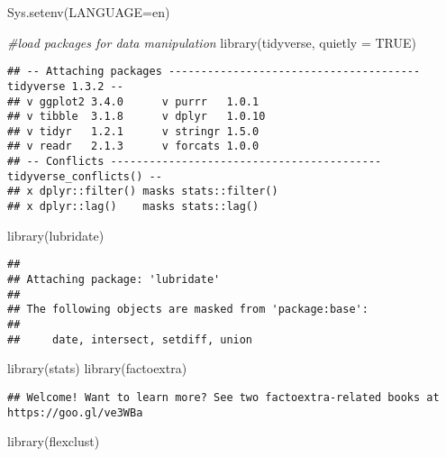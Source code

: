 \documentclass[
]{article}
\newenvironment{Shaded}{\begin{snugshade}}{\end{snugshade}}
\newcommand{\AttributeTok}[1]{\textcolor[rgb]{0.77,0.63,0.00}{#1}}
\newcommand{\CommentTok}[1]{\textcolor[rgb]{0.56,0.35,0.01}{\textit{#1}}}
\newcommand{\ConstantTok}[1]{\textcolor[rgb]{0.00,0.00,0.00}{#1}}
\newcommand{\FunctionTok}[1]{\textcolor[rgb]{0.00,0.00,0.00}{#1}}
\newcommand{\NormalTok}[1]{#1}
\newcommand{\StringTok}[1]{\textcolor[rgb]{0.31,0.60,0.02}{#1}}
\begin{document}
\begin{Shaded}
\begin{Highlighting}[]
\FunctionTok{Sys.setenv}\NormalTok{(}\AttributeTok{LANGUAGE=}\StringTok{\textquotesingle{}en\textquotesingle{}}\NormalTok{)}

\CommentTok{\#load packages for data manipulation}
\FunctionTok{library}\NormalTok{(tidyverse, }\AttributeTok{quietly =} \ConstantTok{TRUE}\NormalTok{)}
\end{Highlighting}
\end{Shaded}

\begin{verbatim}
## -- Attaching packages --------------------------------------- tidyverse 1.3.2 --
## v ggplot2 3.4.0      v purrr   1.0.1 
## v tibble  3.1.8      v dplyr   1.0.10
## v tidyr   1.2.1      v stringr 1.5.0 
## v readr   2.1.3      v forcats 1.0.0 
## -- Conflicts ------------------------------------------ tidyverse_conflicts() --
## x dplyr::filter() masks stats::filter()
## x dplyr::lag()    masks stats::lag()
\end{verbatim}

\begin{Shaded}
\begin{Highlighting}[]
\FunctionTok{library}\NormalTok{(lubridate)}
\end{Highlighting}
\end{Shaded}

\begin{verbatim}
## 
## Attaching package: 'lubridate'
## 
## The following objects are masked from 'package:base':
## 
##     date, intersect, setdiff, union
\end{verbatim}

\begin{Shaded}
\begin{Highlighting}[]
\FunctionTok{library}\NormalTok{(stats)}
\FunctionTok{library}\NormalTok{(factoextra)}
\end{Highlighting}
\end{Shaded}

\begin{verbatim}
## Welcome! Want to learn more? See two factoextra-related books at https://goo.gl/ve3WBa
\end{verbatim}

\begin{Shaded}
\begin{Highlighting}[]
\FunctionTok{library}\NormalTok{(flexclust)}
\end{Highlighting}
\end{Shaded}
\end{document}
